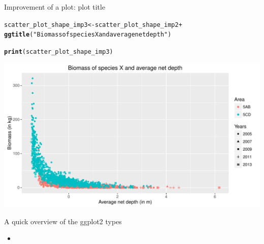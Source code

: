 \documentclass{beamer}\usepackage[]{graphicx}\usepackage[]{color}
\makeatletter
\newcommand{\hlstr}[1]{\textcolor[rgb]{0.192,0.494,0.8}{#1}}%
\newcommand{\hlopt}[1]{\textcolor[rgb]{0,0,0}{#1}}%
\newcommand{\hlstd}[1]{\textcolor[rgb]{0.345,0.345,0.345}{#1}}%
\newcommand{\hlkwb}[1]{\textcolor[rgb]{0.69,0.353,0.396}{#1}}%
\newcommand{\hlkwd}[1]{\textcolor[rgb]{0.737,0.353,0.396}{\textbf{#1}}}%
\newenvironment{kframe}{%
 \def\at@end@of@kframe{}%
 \ifinner\ifhmode%
  \def\at@end@of@kframe{\end{minipage}}%
  \begin{minipage}{\columnwidth}%
 \fi\fi%
 \def\FrameCommand##1{\hskip\@totalleftmargin \hskip-\fboxsep
 \colorbox{shadecolor}{##1}\hskip-\fboxsep
     \hskip-\linewidth \hskip-\@totalleftmargin \hskip\columnwidth}%
 \MakeFramed {\advance\hsize-\width
   \@totalleftmargin\z@ \linewidth\hsize
   \@setminipage}}%
 {\par\unskip\endMakeFramed%
 \at@end@of@kframe}
\newenvironment{knitrout}{}{} %
\makeatother
\begin{document}
\begin{frame}[fragile]{Improvement of a plot: plot title}
\begin{knitrout}\footnotesize
{}\color{fgcolor}\begin{kframe}
\begin{alltt}
  \hlstd{scatter_plot_shape_imp3} \hlkwb{<-} \hlstd{scatter_plot_shape_imp2} \hlopt{+}
   \hlkwd{ggtitle}\hlstd{(}\hlstr{"Biomass of species X and average net depth"}\hlstd{)}

  \hlkwd{print}\hlstd{(scatter_plot_shape_imp3)}
\end{alltt}
\end{kframe}

{\centering \includegraphics[width=.9\linewidth]{figure/scatter_plot_shape_imp3-1} 

}



\end{knitrout}
\end{frame}

\begin{frame}[fragile]{A quick overview of the ggplot2 types}
\begin{itemize}
        \item %
		\end{itemize}
\end{frame}
\end{document}
